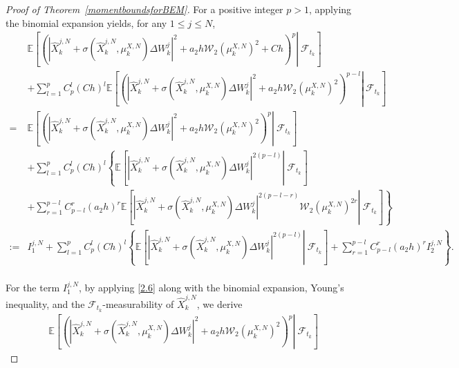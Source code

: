 \documentclass[12pt]{article}
\numberwithin{equation}{section}
\begin{document}
\begin{proof}[Proof of Theorem~\ref{momentboundsforBEM}]
For a positive integer  $p > 1$,   applying the binomial expansion yields, for any $1 \leq j \leq N$, 
\begin{equation}\tag{5.113}\label{6.9}
\begin{aligned}
&\mathbb{E} \left[\left. \left( \left| \hat{X}_{k}^{j,N}+\sigma \left( \hat{X}_{k}^{j,N},\mu _{k}^{X,N} \right) \Delta W_{k}^{j} \right|^2+a_2h\mathcal{W} _2\left( \mu _{k}^{X,N} \right) ^2+Ch \right) ^p\right\rvert\ \mathcal{F}_{t_{k}} \right] 
\\
&+\sum_{l=1}^p{C_{p}^{l}\left( Ch \right) ^l\mathbb{E} \left[\left. \left( \left| \hat{X}_{k}^{j,N}+\sigma \left( \hat{X}_{k}^{j,N},\mu _{k}^{X,N} \right) \Delta W_{k}^{j} \right|^2+a_2h\mathcal{W} _2\left( \mu _{k}^{X,N} \right) ^2 \right) ^{p-l}\right\rvert\ \mathcal{F}_{t_{k}} \right]}
\\
=&\mathbb{E} \left[\left. \left( \left| \hat{X}_{k}^{j,N}+\sigma \left( \hat{X}_{k}^{j,N},\mu _{k}^{X,N} \right) \Delta W_{k}^{j} \right|^2+a_2h\mathcal{W} _2\left( \mu _{k}^{X,N} \right) ^2 \right) ^p\right\rvert\ \mathcal{F}_{t_{k}} \right] 
\\
&+\sum_{l=1}^p C_{p}^{l} \left( Ch \right)^l\left\{\mathbb{E}\left[\left. \left|\hat{X}_{k}^{j,N}+\sigma \left( \hat{X}_{k}^{j,N},\mu_{k}^{X,N} \right) \Delta W_{k}^{j} \right|^{2\left(p-l\right)} \right\rvert\ \mathcal{F}_{t_{k}}\right] \right.\\
&\left.+ \sum_{r=1}^{p-l}{C_{p-l}^{r}\left( a_2h \right) ^r\mathbb{E} \left[\left. \left| \hat{X}_{k}^{j,N}+\sigma \left( \hat{X}_{k}^{j,N},\mu _{k}^{X,N} \right) \Delta W_{k}^{j} \right|^{2\left( p-l-r \right)}\mathcal{W} _2\left( \mu _{k}^{X,N} \right) ^{2r} \right\rvert\ \mathcal{F}_{t_{k}}\right]} \right\}\\
:=&I_{1}^{j,N}+\sum_{l=1}^p{C_{p}^{l}\left( Ch \right) ^l\left\{ \mathbb{E} \left[\left. \left| \hat{X}_{k}^{j,N}+\sigma \left( \hat{X}_{k}^{j,N},\mu _{k}^{X,N} \right) \Delta W_{k}^{j} \right|^{2\left(p-l\right)}\right\rvert\ \mathcal{F}_{t_{k}} \right]+ \sum_{r=1}^{p-l}{C_{p-l}^{r}\left( a_2h \right) ^rI_{2}^{j,N}} \right\}}.
\end{aligned}
\end{equation}\\
For the term $ I_1^{j,N} $, by applying \eqref{2.6} along with the binomial expansion, Young's inequality, and the $\mathcal{F}_{t_k}$-measurability of $\hat{X}_k^{j,N}$, we derive
\begin{equation}\tag{5.114}\label{6.10}
\begin{aligned}
&\mathbb{E} \left[ \left.\left( \left| \hat{X}_{k}^{j,N}+\sigma \left( \hat{X}_{k}^{j,N},\mu _{k}^{X,N} \right) \Delta W_{k}^{j} \right|^2+a_2h\mathcal{W} _2\left( \mu _{k}^{X,N} \right) ^2 \right) ^p \right\rvert\ \mathcal{F}_{t_{k}}\right] 

\end{aligned}
\end{equation}
\end{proof}
\end{document}
